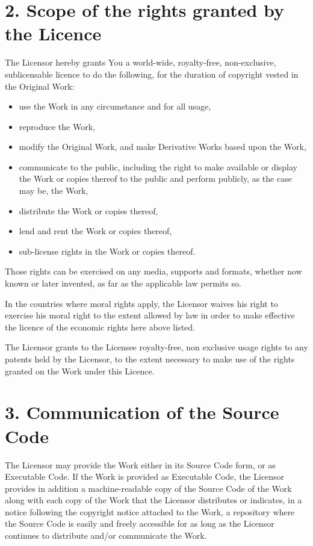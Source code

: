\documentclass[letterpaper,10pt,english]{sphinxmanual}
\begin{document}
\section{2. Scope of the rights granted by the Licence}
\label{license:scope-of-the-rights-granted-by-the-licence}
The Licensor hereby grants You a world-wide, royalty-free, non-exclusive, sublicensable
licence to do the following, for the duration of copyright vested in the
Original Work:
\begin{itemize}
\item {} 
use the Work in any circumstance and for all usage,

\item {} 
reproduce the Work,

\item {} 
modify the Original Work, and make Derivative Works based upon the Work,

\item {} 
communicate to the public, including the right to make available or display the
Work or copies thereof to the public and perform publicly, as the case may be, the Work,

\item {} 
distribute the Work or copies thereof,

\item {} 
lend and rent the Work or copies thereof,

\item {} 
sub-license rights in the Work or copies thereof.

\end{itemize}

Those rights can be exercised on any media, supports and formats, whether now
known or later invented, as far as the applicable law permits so.

In the countries where moral rights apply, the Licensor waives his right to exercise his
moral right to the extent allowed by law in order to make effective the licence of the
economic rights here above listed.

The Licensor grants to the Licensee royalty-free, non exclusive usage rights to any
patents held by the Licensor, to the extent necessary to make use of the rights granted
on the Work under this Licence.


\section{3. Communication of the Source Code}
\label{license:communication-of-the-source-code}
The Licensor may provide the Work either in its Source Code form, or as Executable
Code. If the Work is provided as Executable Code, the Licensor provides in addition a
machine-readable copy of the Source Code of the Work along with each copy of the
Work that the Licensor distributes or indicates, in a notice following the copyright
notice attached to the Work, a repository where the Source Code is easily and freely
accessible for as long as the Licensor continues to distribute and/or communicate the
Work.
\end{document}
